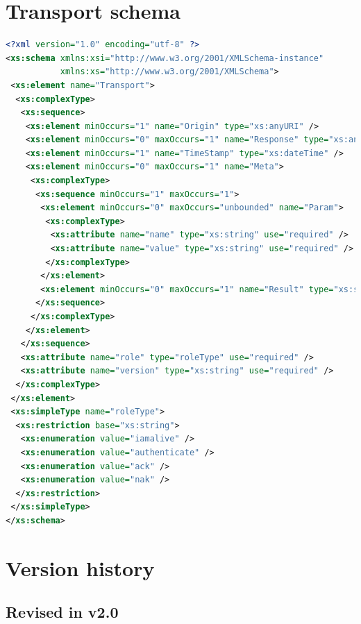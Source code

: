\documentclass[a4paper,11pt]{ivoa}
\begin{document}
\section{Transport schema}
\label{sec:transportschema}

\begin{lstlisting}[language=XML]
<?xml version="1.0" encoding="utf-8" ?>
<xs:schema xmlns:xsi="http://www.w3.org/2001/XMLSchema-instance"
           xmlns:xs="http://www.w3.org/2001/XMLSchema">
 <xs:element name="Transport">
  <xs:complexType>
   <xs:sequence>
    <xs:element minOccurs="1" name="Origin" type="xs:anyURI" />
    <xs:element minOccurs="0" maxOccurs="1" name="Response" type="xs:anyURI" />
    <xs:element minOccurs="1" name="TimeStamp" type="xs:dateTime" />
    <xs:element minOccurs="0" maxOccurs="1" name="Meta">
     <xs:complexType>
      <xs:sequence minOccurs="1" maxOccurs="1">
       <xs:element minOccurs="0" maxOccurs="unbounded" name="Param">
        <xs:complexType>
         <xs:attribute name="name" type="xs:string" use="required" />
         <xs:attribute name="value" type="xs:string" use="required" />
        </xs:complexType>
       </xs:element>
       <xs:element minOccurs="0" maxOccurs="1" name="Result" type="xs:string" />
      </xs:sequence>
     </xs:complexType>
    </xs:element>
   </xs:sequence>
   <xs:attribute name="role" type="roleType" use="required" />
   <xs:attribute name="version" type="xs:string" use="required" />
  </xs:complexType>
 </xs:element>
 <xs:simpleType name="roleType">
  <xs:restriction base="xs:string">
   <xs:enumeration value="iamalive" />
   <xs:enumeration value="authenticate" />
   <xs:enumeration value="ack" />
   <xs:enumeration value="nak" />
  </xs:restriction>
 </xs:simpleType>
</xs:schema>
\end{lstlisting}

\section{Version history}

\subsection{Revised in v2.0}
\end{document}
